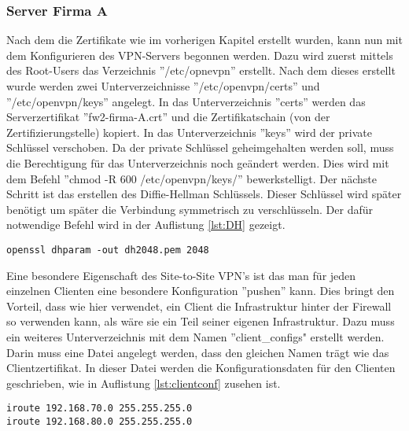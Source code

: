 \subsubsection{Server Firma A}
Nach dem die Zertifikate wie im vorherigen Kapitel erstellt wurden, kann nun mit dem Konfigurieren des VPN-Servers begonnen werden. Dazu wird zuerst mittels des Root-Users das Verzeichnis ''/etc/opnevpn'' erstellt. Nach dem dieses erstellt wurde werden zwei Unterverzeichnisse ''/etc/openvpn/certs'' und ''/etc/openvpn/keys'' angelegt. In das Unterverzeichnis ''certs'' werden das Serverzertifikat ''fw2-firma-A.crt'' und die Zertifikatschain (von der Zertifizierungstelle) kopiert. In das Unterverzeichnis ''keys'' wird der private Schlüssel verschoben. Da der private Schlüssel geheimgehalten werden soll, muss die Berechtigung für das Unterverzeichnis noch geändert werden. Dies wird mit dem Befehl ''chmod -R 600 /etc/openvpn/keys/'' bewerkstelligt. Der nächste Schritt ist das erstellen des Diffie-Hellman Schlüssels. Dieser Schlüssel wird später benötigt um später die Verbindung symmetrisch zu verschlüsseln. Der dafür notwendige Befehl wird in der Auflistung \ref{lst:DH} gezeigt.\newline
\lstset{
	basicstyle=\footnotesize, frame=tb,
	xleftmargin=.2\textwidth, xrightmargin=.2\textwidth
}
\begin{lstlisting}[caption={Erzeugen des Diffie-Hellman Schlüssels},label=lst:DH]
openssl dhparam -out dh2048.pem 2048
\end{lstlisting}
\vspace{\baselineskip}
Eine besondere Eigenschaft des Site-to-Site VPN's ist das man für jeden einzelnen Clienten eine besondere Konfiguration ''pushen'' kann. Dies bringt den Vorteil, dass wie hier verwendet, ein Client die Infrastruktur hinter der Firewall so verwenden kann, als wäre sie ein Teil seiner eigenen Infrastruktur. Dazu muss ein weiteres Unterverzeichnis mit dem Namen ''client\_configs" erstellt werden. Darin muss eine Datei angelegt werden, dass den gleichen Namen trägt wie das Clientzertifikat. In dieser Datei werden die Konfigurationsdaten für den Clienten geschrieben, wie in Auflistung \ref{lst:clientconf} zusehen ist.\newline
\lstset{
	basicstyle=\footnotesize, frame=tb,
	xleftmargin=.2\textwidth, xrightmargin=.2\textwidth
}
\begin{lstlisting}[caption={Clientkonfigurationsdatei fw-firma-b},label=lst:clientconf]
iroute 192.168.70.0 255.255.255.0
iroute 192.168.80.0 255.255.255.0
\end{lstlisting}

